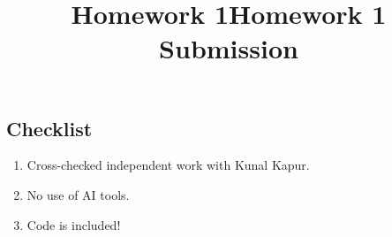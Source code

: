 \documentclass[]{exam}
\title{Homework 1}
\title{Homework 1 Submission}
\begin{document}
\maketitle

\hypertarget{problem-0-homework-checklist}{%
\subsection{Checklist}\label{problem-0-homework-checklist}}


\begin{enumerate}
	\item Cross-checked independent work with Kunal Kapur.
	\item No use of AI tools.
	\item Code is included!
\end{enumerate}
\end{document}
